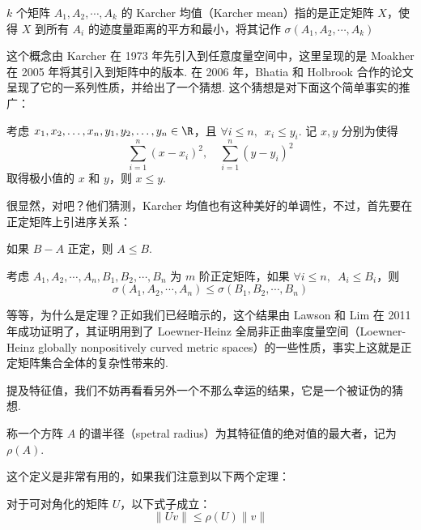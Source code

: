 \begin{definition}
    $k$ 个矩阵 $A_1, A_2, \cdots, A_k$ 的 Karcher 均值（Karcher mean）指的是正定矩阵 $X$，使得 $X$ 到所有 $A_i$ 的迹度量距离的平方和最小，将其记作 $\sigma(A_1, A_2, \cdots, A_k)$
\end{definition}

这个概念由 Karcher 在 1973 年先引入到任意度量空间中，这里呈现的是 Moakher 在 2005 年将其引入到矩阵中的版本. 在 2006 年，Bhatia 和 Holbrook 合作的论文呈现了它的一系列性质，并给出了一个猜想. 这个猜想是对下面这个简单事实的推广：

\begin{lemma}
考虑 $x_1, x_2, \ldots, x_n, y_1, y_2, \ldots, y_n \in \R$，且 $\forall i \leqslant n,\enspace x_i \leqslant y_i$. 记 $x, y$ 分别为使得
\[
\sum_{i = 1}^n (x - x_i)^2, \quad \sum_{i = 1}^n (y - y_i)^2
\]
取得极小值的 $x$ 和 $y$，则 $x \leqslant y$.
\end{lemma}

很显然，对吧？他们猜测，Karcher 均值也有这种美好的单调性，不过，首先要在正定矩阵上引进序关系：

\begin{definition}
    如果 $B - A$ 正定，则 $A \leqslant B$.
\end{definition}

\begin{theorem}
    考虑 $A_1, A_2, \cdots, A_n, B_1, B_2, \cdots, B_n$ 为 $m$ 阶正定矩阵，如果 $\forall i \leqslant n,\enspace A_i \leqslant B_i$，则
    \[
    \sigma(A_1, A_2, \cdots, A_n) \leqslant \sigma(B_1, B_2, \cdots, B_n)
    \]
\end{theorem}

等等，为什么是定理？正如我们已经暗示的，这个结果由 Lawson 和 Lim 在 2011 年成功证明了，其证明用到了 Loewner-Heinz 全局非正曲率度量空间（Loewner-Heinz globally nonpositively curved metric spaces）的一些性质，事实上这就是正定矩阵集合全体的复杂性带来的.

提及特征值，我们不妨再看看另外一个不那么幸运的结果，它是一个被证伪的猜想.

\begin{definition}
    称一个方阵 $A$ 的谱半径（spetral radius）为其特征值的绝对值的最大者，记为 $\rho(A)$.
\end{definition}

这个定义是非常有用的，如果我们注意到以下两个定理：

\begin{theorem}
    对于可对角化的矩阵 $U$，以下式子成立：
    \[
    \lVert Uv \rVert \leqslant \rho(U) \lVert v \rVert
    \]
\end{theorem}

